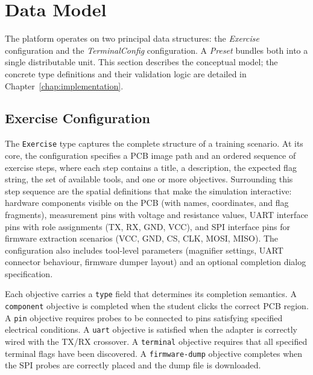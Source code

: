 \section{Data Model}\label{sec:datamodel}

The platform operates on two principal data structures: the \emph{Exercise} configuration and the \emph{TerminalConfig} configuration. A \emph{Preset} bundles both into a single distributable unit. This section describes the conceptual model; the concrete type definitions and their validation logic are detailed in Chapter~\ref{chap:implementation}.

\subsection{Exercise Configuration}\label{subsec:exercise-model}

The \texttt{Exercise} type captures the complete structure of a training scenario. At its core, the configuration specifies a PCB image path and an ordered sequence of exercise steps, where each step contains a title, a description, the expected flag string, the set of available tools, and one or more objectives. Surrounding this step sequence are the spatial definitions that make the simulation interactive: hardware components visible on the PCB (with names, coordinates, and flag fragments), measurement pins with voltage and resistance values, UART interface pins with role assignments (TX, RX, GND, VCC), and SPI interface pins for firmware extraction scenarios (VCC, GND, CS, CLK, MOSI, MISO). The configuration also includes tool-level parameters (magnifier settings, UART connector behaviour, firmware dumper layout) and an optional completion dialog specification.

Each objective carries a \texttt{type} field that determines its completion semantics. A \texttt{component} objective is completed when the student clicks the correct PCB region. A \texttt{pin} objective requires probes to be connected to pins satisfying specified electrical conditions. A \texttt{uart} objective is satisfied when the adapter is correctly wired with the TX/RX crossover. A \texttt{terminal} objective requires that all specified terminal flags have been discovered. A \texttt{firmware-dump} objective completes when the SPI probes are correctly placed and the dump file is downloaded.

